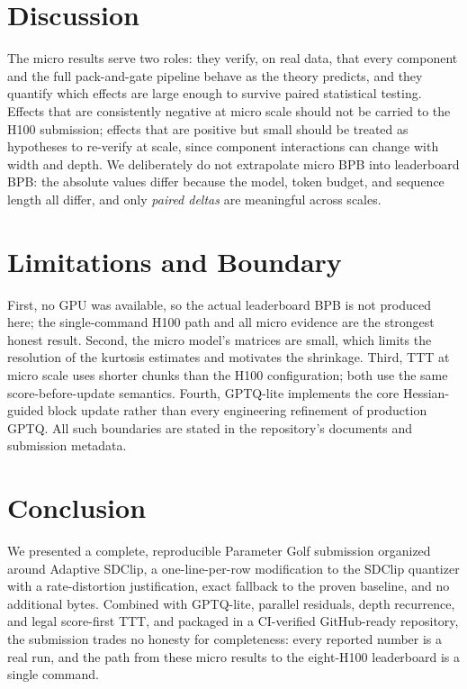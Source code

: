\documentclass[10pt]{article}
\begin{document}
\section{Discussion}

The micro results serve two roles: they verify, on real data, that every component and
the full pack-and-gate pipeline behave as the theory predicts, and they quantify which
effects are large enough to survive paired statistical testing. Effects that are
consistently negative at micro scale should not be carried to the H100 submission;
effects that are positive but small should be treated as hypotheses to re-verify at
scale, since component interactions can change with width and depth. We deliberately do
not extrapolate micro BPB into leaderboard BPB: the absolute values differ because the
model, token budget, and sequence length all differ, and only \emph{paired deltas} are
meaningful across scales.

\section{Limitations and Boundary}

First, no GPU was available, so the actual leaderboard BPB is not produced here; the
single-command H100 path and all micro evidence are the strongest honest result.
Second, the micro model's matrices are small, which limits the resolution of the
kurtosis estimates and motivates the shrinkage. Third, TTT at micro scale uses shorter
chunks than the H100 configuration; both use the same score-before-update semantics.
Fourth, GPTQ-lite implements the core Hessian-guided block update rather than every
engineering refinement of production GPTQ. All such boundaries are stated in the
repository's documents and submission metadata.

\section{Conclusion}

We presented a complete, reproducible Parameter Golf submission organized around
Adaptive SDClip, a one-line-per-row modification to the SDClip quantizer with a
rate-distortion justification, exact fallback to the proven baseline, and no additional
bytes. Combined with GPTQ-lite, parallel residuals, depth recurrence, and legal
score-first TTT, and packaged in a CI-verified GitHub-ready repository, the submission
trades no honesty for completeness: every reported number is a real run, and the path
from these micro results to the eight-H100 leaderboard is a single command.
\end{document}
